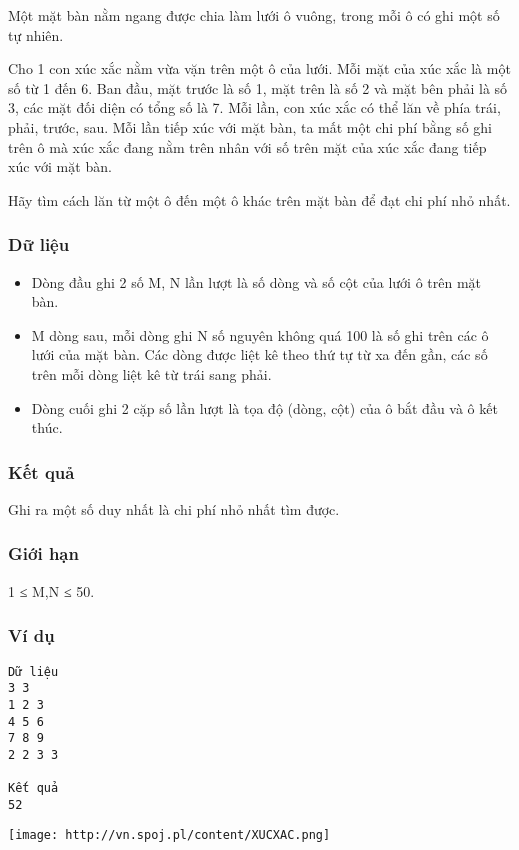 



   Một mặt bàn nằm ngang được chia làm lưới ô vuông, trong mỗi ô có ghi một số tự nhiên.  

   Cho 1 con xúc xắc nằm vừa vặn trên một ô của lưới. Mỗi mặt của xúc xắc là một số từ 1 đến 6. Ban đầu, mặt trước là số 1, mặt trên là số 2 và mặt bên phải là số 3, các mặt đối diện có tổng số là 7. Mỗi lần, con xúc xắc có thể lăn về phía trái, phải, trước, sau. Mỗi lần tiếp xúc với mặt bàn, ta mất một chi phí bằng số ghi trên ô mà xúc xắc đang nằm trên nhân với số trên mặt của xúc xắc đang tiếp xúc với mặt bàn.  

   Hãy tìm cách lăn từ một ô đến một ô khác trên mặt bàn để đạt chi phí nhỏ nhất.  

\subsubsection{   Dữ liệu  }
\begin{itemize}
	\item     Dòng đầu ghi 2 số M, N lần lượt là số dòng và số cột của lưới ô trên mặt bàn.   
	\item     M dòng sau, mỗi dòng ghi N số nguyên không quá 100 là số ghi trên các ô lưới của mặt bàn. Các dòng được liệt kê theo thứ tự từ xa đến gần, các số trên mỗi dòng liệt kê từ trái sang phải.   
	\item     Dòng cuối ghi 2 cặp số lần lượt là tọa độ (dòng, cột) của ô bắt đầu và ô kết thúc.   
\end{itemize}

\subsubsection{   Kết quả  }

   Ghi ra một số duy nhất là chi phí nhỏ nhất tìm được.  

\subsubsection{   Giới hạn  }

   1 ≤ M,N ≤ 50.  

\subsubsection{   Ví dụ  }
\begin{verbatim}
Dữ liệu
3 3
1 2 3
4 5 6
7 8 9
2 2 3 3

Kết quả
52
\end{verbatim}


\texttt{[image: http://vn.spoj.pl/content/XUCXAC.png]}